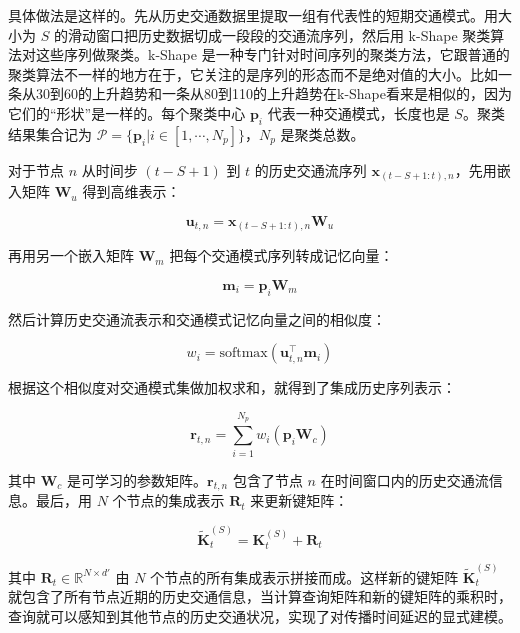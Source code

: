 具体做法是这样的。先从历史交通数据里提取一组有代表性的短期交通模式。用大小为 $S$ 的滑动窗口把历史数据切成一段段的交通流序列，然后用 k-Shape 聚类算法对这些序列做聚类。k-Shape 是一种专门针对时间序列的聚类方法，它跟普通的聚类算法不一样的地方在于，它关注的是序列的形态而不是绝对值的大小。比如一条从30到60的上升趋势和一条从80到110的上升趋势在k-Shape看来是相似的，因为它们的“形状”是一样的。每个聚类中心 $\boldsymbol{p}_i$ 代表一种交通模式，长度也是 $S$。聚类结果集合记为 $\mathcal{P} = \{\boldsymbol{p}_i | i \in [1, \cdots, N_p]\}$，$N_p$ 是聚类总数。

对于节点 $n$ 从时间步 $(t - S + 1)$ 到 $t$ 的历史交通流序列 $\boldsymbol{x}_{(t-S+1:t), n}$，先用嵌入矩阵 $\boldsymbol{W}_u$ 得到高维表示：

\begin{equation}
\boldsymbol{u}_{t,n} = \boldsymbol{x}_{(t-S+1:t), n} \boldsymbol{W}_u
\end{equation}

再用另一个嵌入矩阵 $\boldsymbol{W}_m$ 把每个交通模式序列转成记忆向量：

\begin{equation}
\boldsymbol{m}_i = \boldsymbol{p}_i \boldsymbol{W}_m
\end{equation}

然后计算历史交通流表示和交通模式记忆向量之间的相似度：

\begin{equation}
w_i = \text{softmax}(\boldsymbol{u}_{t,n}^\top \boldsymbol{m}_i)
\end{equation}

根据这个相似度对交通模式集做加权求和，就得到了集成历史序列表示：

\begin{equation}
\boldsymbol{r}_{t,n} = \sum_{i=1}^{N_p} w_i (\boldsymbol{p}_i \boldsymbol{W}_c)
\end{equation}

其中 $\boldsymbol{W}_c$ 是可学习的参数矩阵。$\boldsymbol{r}_{t,n}$ 包含了节点 $n$ 在时间窗口内的历史交通流信息。最后，用 $N$ 个节点的集成表示 $\boldsymbol{R}_t$ 来更新键矩阵：

\begin{equation}
\tilde{\boldsymbol{K}}_t^{(S)} = \boldsymbol{K}_t^{(S)} + \boldsymbol{R}_t
\end{equation}

其中 $\boldsymbol{R}_t \in \mathbb{R}^{N \times d'}$ 由 $N$ 个节点的所有集成表示拼接而成。这样新的键矩阵 $\tilde{\boldsymbol{K}}_t^{(S)}$ 就包含了所有节点近期的历史交通信息，当计算查询矩阵和新的键矩阵的乘积时，查询就可以感知到其他节点的历史交通状况，实现了对传播时间延迟的显式建模。

